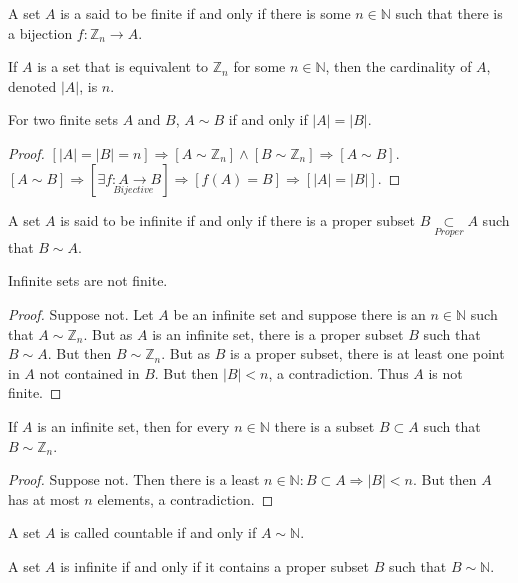 \documentclass[crop=false,class=book]{standalone}
\begin{document}
\begin{definition}
A set $A$ is a said to be finite if and only if there is some $n\in \mathbb{N}$ such that there is a bijection $f:\mathbb{Z}_n \rightarrow A$.
\end{definition}
\begin{definition}
If $A$ is a set that is equivalent to $\mathbb{Z}_n$ for some $n\in \mathbb{N}$, then the cardinality of $A$, denoted $|A|$, is $n$.
\end{definition}
\begin{theorem}
For two finite sets $A$ and $B$, $A\sim B$ if and only if $|A|=|B|$.
\end{theorem}
\begin{proof}
$[|A|=|B|=n]\Rightarrow[A\sim \mathbb{Z}_n]\land[B\sim \mathbb{Z}_n]\Rightarrow [A\sim B]$. $[A\sim B]\Rightarrow [\exists \underset{Bijective}{f:A\rightarrow B}]\Rightarrow [f(A) = B]\Rightarrow [|A|=|B|]$.
\end{proof}
\begin{definition}
A set $A$ is said to be infinite if and only if there is a proper subset $B\underset{Proper}\subset A$ such that $B\sim A$.
\end{definition}
\begin{theorem}
Infinite sets are not finite.
\end{theorem}
\begin{proof}
Suppose not. Let $A$ be an infinite set and suppose there is an $n\in \mathbb{N}$ such that $A\sim \mathbb{Z}_n$. But as $A$ is an infinite set, there is a proper subset $B$ such that $B\sim A$. But then $B\sim \mathbb{Z}_n$. But as $B$ is a proper subset, there is at least one point in $A$ not contained in $B$. But then $|B|<n$, a contradiction. Thus $A$ is not finite.
\end{proof}
\begin{corollary}
If $A$ is an infinite set, then for every $n\in \mathbb{N}$ there is a subset $B\subset A$ such that $B\sim \mathbb{Z}_n$.
\end{corollary}
\begin{proof}
Suppose not. Then there is a least $n\in \mathbb{N}:B\subset A\Rightarrow |B|<n$. But then $A$ has at most $n$ elements, a contradiction.
\end{proof}
\begin{definition}
A set $A$ is called countable if and only if $A\sim \mathbb{N}$.
\end{definition}
\begin{theorem}
A set $A$ is infinite if and only if it contains a proper subset $B$ such that $B\sim \mathbb{N}$.
\end{theorem}
\end{document}
